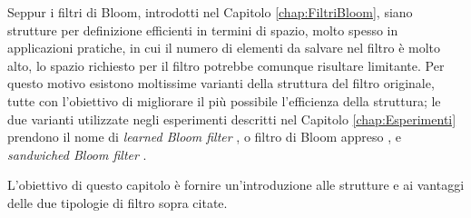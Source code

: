 \documentclass[../../main.tex]{subfiles}
\begin{document}
    Seppur i filtri di Bloom, introdotti nel Capitolo \ref{chap:FiltriBloom}, siano strutture per definizione efficienti in termini di spazio, molto spesso in applicazioni pratiche, in cui il numero di elementi da salvare nel filtro è molto alto, lo spazio richiesto per il filtro potrebbe comunque risultare limitante. Per questo motivo esistono moltissime varianti della struttura del filtro originale, tutte con l'obiettivo di migliorare il più possibile l'efficienza della struttura; le due varianti utilizzate negli esperimenti descritti nel Capitolo \ref{chap:Esperimenti} prendono il nome di \textit{learned Bloom filter} , o filtro di Bloom appreso \cite{kraska2018case}, e \textit{sandwiched Bloom filter} \cite{10.5555/3326943.3326986}. 

    L'obiettivo di questo capitolo è fornire un'introduzione alle strutture e ai vantaggi delle due tipologie di filtro sopra citate.
\end{document}
